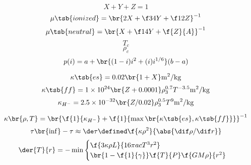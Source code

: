 \documentclass{article}
\begin{document}
\[ X + Y + Z = 1 \]
\[ \mu\tsb{ionized} = \br{2 X + \f34 Y + \f12 Z}^{-1} \]
\[ \mu\tsb{neutral} = \br{X + \f14 Y + \f{Z}{A}}^{-1} \]
\[ T_c \]
\[ \rho_c \]
\[ p(i) = a + \br{(1-i) i^2 + (i) i^{1/6}} (b - a) \]


\[ \kappa\tsb{es} = 0.02\br{1+X} \SI{}{\m^2\per \kg} \]
\[ \kappa\tsb{ff} = \SI{1e24}{}\br{Z + 0.0001} \rho_3^{0.7} T^{-3.5} \SI{}{\m^2\per \kg} \]
\[ \kappa_{H^-} = \SI{2.5e-32}{}\br{Z/0.02} \rho_3^{0.5} T^{9} \SI{}{\m^2\per \kg} \]

\[ \kappa\br{\rho,T} = \br{\f{1}{\kappa_{H^-}} + \f{1}{\max\br{\kappa\tsb{es},\kappa\tsb{ff}}}}^{-1} \]
\[ \tau\br{\inf} - \tau \approx \de \tau \defined \f{\kappa \rho^2}{\abs{\dif \rho / \dif r}} \]
\[ \der{T}{r} = - \min \begin{cases}
    \f{3 \kappa \rho L}{16 \pi a c T^3 r^2} \\
    \br{1- \f{1}{\gamma}} \f{T}{P}\f{GM\rho}{r^2}
\end{cases} \]
\end{document}
